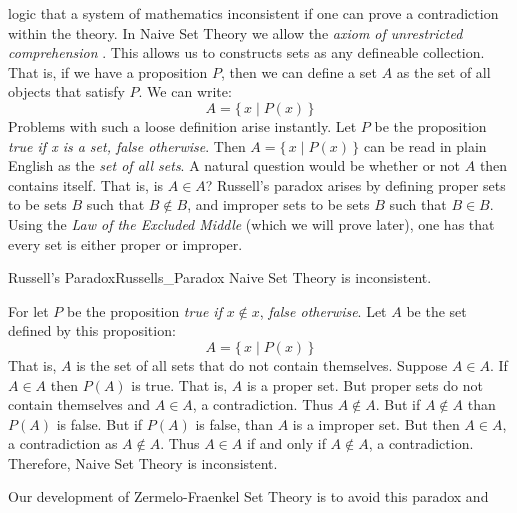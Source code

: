     logic that a system of mathematics inconsistent if one can prove a
    contradiction within the theory. In Naive Set Theory
    we allow the \textit{axiom of unrestricted comprehension}%
    . This allows us to constructs
    sets as any defineable collection. That is, if we have a proposition $P$,
    then we can define a set $A$ as the set of all objects that satisfy $P$.
    We can write:
    \begin{equation}
        A=\big\{\,x\;|\;P(x)\,\big\}
    \end{equation}
    Problems with such a loose definition arise instantly. Let $P$ be the
    proposition \textit{true if x is a set, false otherwise}. Then
    $A=\{\,x\;|\;P(x)\,\}$ can be read in plain English as the
    \textit{set of all sets}. A natural question would be
    whether or not $A$ then contains itself. That is, is $A\in{A}$? Russell's
    paradox arises by defining proper sets to be sets $B$ such that
    $B\notin{B}$, and improper sets to be sets $B$ such that $B\in{B}$. Using
    the \textit{Law of the Excluded Middle}
    (which we will prove later), one has that every set is either proper or
    improper.
    \begin{ftheorem}{Russell's Paradox}{Russells_Paradox}
        Naive Set Theory is inconsistent.
    \end{ftheorem}
    \begin{bproof}
        For let $P$ be the proposition \textit{true if} $x\notin{x}$,
        \textit{false otherwise}. Let $A$ be the set defined by this
        proposition:
        \begin{equation}
            A=\big\{\,x\;|\;P(x)\,\big\}
        \end{equation}
        That is, $A$ is the set of all sets that do not contain themselves.
        Suppose $A\in{A}$. If $A\in{A}$ then $P(A)$ is true. That is, $A$ is a
        proper set. But proper sets do not contain themselves and $A\in{A}$, a
        contradiction. Thus $A\notin{A}$. But if $A\notin{A}$ than $P(A)$ is
        false. But if $P(A)$ is false, than $A$ is a improper set. But then
        $A\in{A}$, a contradiction as $A\notin{A}$. Thus $A\in{A}$ if and only
        if $A\notin{A}$, a contradiction. Therefore, Naive Set Theory is
        inconsistent.
    \end{bproof}
    Our development of Zermelo-Fraenkel Set Theory is to avoid this paradox and
